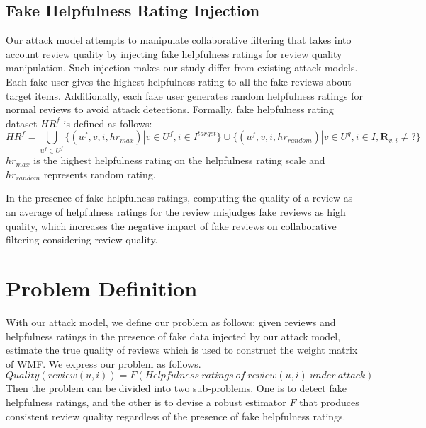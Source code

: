 \documentclass[master,english,final]{kaist-ucs}
\begin{document}
\subsection{Fake Helpfulness Rating Injection}
Our attack model attempts to manipulate collaborative filtering that takes into account review quality by injecting fake helpfulness ratings for review quality manipulation.
Such injection makes our study differ from existing attack models.
Each fake user gives the highest helpfulness rating to all the fake reviews about target items.
Additionally, each fake user generates random helpfulness ratings for normal reviews to avoid attack detections.
Formally, fake helpfulness rating dataset $HR^f$ is defined as follows:
\begin{equation}
HR^f = \bigcup_{u^f \in U^f} \{(u^f,v, i, hr_{max}) | v \in U^f,i \in I^{target} \} \cup \{(u^f,v,i,hr_{random}) | v \in U^g, i \in I, \bm{R}_{v,i} \neq ? \}
\end{equation}
$hr_{max}$ is the highest helpfulness rating on the helpfulness rating scale and $hr_{random}$ represents random rating.

In the presence of fake helpfulness ratings, computing the quality of a review as an average of helpfulness ratings for the review misjudges fake reviews as high quality, which increases the negative impact of fake reviews on collaborative filtering considering review quality.

\section{Problem Definition}
With our attack model, we define our problem as follows: given reviews and helpfulness ratings in the presence of fake data injected by our attack model, estimate the true quality of reviews which is used to construct the weight matrix of WMF.
We express our problem as follows.
\begin{equation} \label{eq:quality_measure}
Quality(review(u,i))=F(Helpfulness\ ratings\ of\ review(u,i)\ under\ attack)
\end{equation}
Then the problem can be divided into two sub-problems.
One is to detect fake helpfulness ratings, and the other is to devise a robust estimator $F$ that produces consistent review quality regardless of the presence of fake helpfulness ratings.
\end{document}
